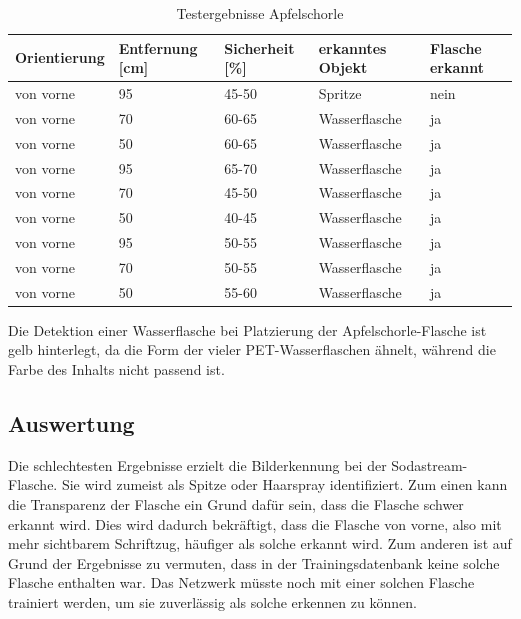\begin{table} [H]
	\centering
	\begin{tabular} {l l l l l}
		Orientierung & Entfernung [cm] & Sicherheit [\%] & erkanntes Objekt & Flasche erkannt\\ \hline
	von vorne&	95&	45-50&	Spritze\cellcolor{red}&nein\cellcolor{red}\\
	von vorne&	70&	60-65&	Wasserflasche\cellcolor{yellow}&ja\cellcolor{green}\\
	von vorne&	50&	60-65&	Wasserflasche\cellcolor{yellow}&ja\cellcolor{green}\\
	von vorne&	95&	65-70&	Wasserflasche\cellcolor{yellow}&ja\cellcolor{green}\\
	von vorne&	70&	45-50&	Wasserflasche\cellcolor{yellow}&ja\cellcolor{green}\\
	von vorne&	50&	40-45&	Wasserflasche\cellcolor{yellow}&ja\cellcolor{green}\\
	von vorne&	95&	50-55&	Wasserflasche\cellcolor{yellow}&ja\cellcolor{green}\\
	von vorne&	70&	50-55&	Wasserflasche\cellcolor{yellow}&ja\cellcolor{green}\\
	von vorne&	50&	55-60&	Wasserflasche\cellcolor{yellow}&ja\cellcolor{green}\\
	\end{tabular}
	\caption{Testergebnisse Apfelschorle}
	\label{Schorle}
\end{table}

Die Detektion einer Wasserflasche bei Platzierung der Apfelschorle-Flasche ist gelb hinterlegt, da die Form der vieler PET-Wasserflaschen ähnelt, während die Farbe des Inhalts nicht passend ist.

\subsection{Auswertung}

Die schlechtesten Ergebnisse erzielt die Bilderkennung bei der Sodastream-Flasche.
Sie wird zumeist als Spitze oder Haarspray identifiziert.
Zum einen kann die Transparenz der Flasche ein Grund dafür sein, dass die Flasche schwer erkannt wird. Dies wird dadurch bekräftigt, dass die Flasche von vorne, also mit mehr sichtbarem Schriftzug, häufiger als solche erkannt wird.
Zum anderen ist auf Grund der Ergebnisse zu vermuten, dass in der Trainingsdatenbank
keine solche Flasche enthalten war. Das Netzwerk müsste noch mit einer solchen Flasche trainiert werden, um sie zuverlässig als solche erkennen zu können.

